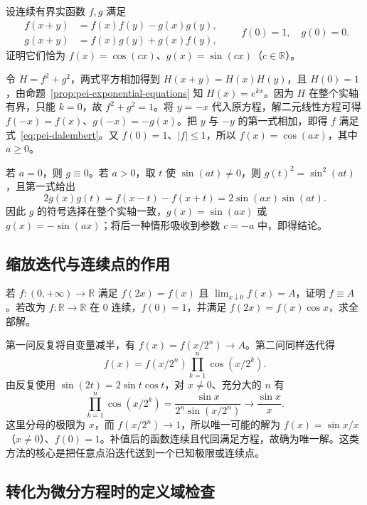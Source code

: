 \begin{example}
设连续有界实函数 $f,g$ 满足
\[
\begin{aligned}
f(x+y)&=f(x)f(y)-g(x)g(y),\\
g(x+y)&=f(x)g(y)+g(x)f(y),
\end{aligned}
\qquad f(0)=1,\quad g(0)=0.
\]
证明它们恰为 $f(x)=\cos(cx)$、$g(x)=\sin(cx)$（$c\in\mathbb R$）。
\end{example}

\begin{solve}
令 $H=f^2+g^2$，两式平方相加得到 $H(x+y)=H(x)H(y)$，且 $H(0)=1$，由命题~\ref{prop:pei-exponential-equations} 知 $H(x)=e^{kx}$。因为 $H$ 在整个实轴有界，只能 $k=0$，故 $f^2+g^2=1$。将 $y=-x$ 代入原方程，解二元线性方程可得 $f(-x)=f(x)$、$g(-x)=-g(x)$。把 $y$ 与 $-y$ 的第一式相加，即得 $f$ 满足式~\eqref{eq:pei-dalembert}。又 $f(0)=1$、$|f|\le1$，所以 $f(x)=\cos(ax)$，其中 $a\ge0$。

若 $a=0$，则 $g\equiv0$。若 $a>0$，取 $t$ 使 $\sin(at)\ne0$，则 $g(t)^2=\sin^2(at)$，且第一式给出
\[
2g(x)g(t)=f(x-t)-f(x+t)=2\sin(ax)\sin(at).
\]
因此 $g$ 的符号选择在整个实轴一致，$g(x)=\sin(ax)$ 或 $g(x)=-\sin(ax)$；将后一种情形吸收到参数 $c=-a$ 中，即得结论。
\end{solve}

\subsection{缩放迭代与连续点的作用}

\begin{example}
若 $f:(0,+\infty)\to\mathbb R$ 满足 $f(2x)=f(x)$ 且 $\lim_{x\downarrow0}f(x)=A$，证明 $f\equiv A$。若改为 $f:\mathbb R\to\mathbb R$ 在 $0$ 连续，$f(0)=1$，并满足 $f(2x)=f(x)\cos x$，求全部解。
\end{example}

\begin{solve}
第一问反复将自变量减半，有 $f(x)=f(x/2^n)\to A$。第二问同样迭代得
\[
f(x)=f(x/2^n)\prod_{k=1}^n\cos(x/2^k).
\]
由反复使用 $\sin(2t)=2\sin t\cos t$，对 $x\ne0$、充分大的 $n$ 有
\[
\prod_{k=1}^n\cos(x/2^k)=\frac{\sin x}{2^n\sin(x/2^n)}\longrightarrow\frac{\sin x}{x}.
\]
这里分母的极限为 $x$，而 $f(x/2^n)\to1$，所以唯一可能的解为 $f(x)=\sin x/x$（$x\ne0$）、$f(0)=1$。补值后的函数连续且代回满足方程，故确为唯一解。这类方法的核心是把任意点沿迭代送到一个已知极限或连续点。
\end{solve}

\subsection{转化为微分方程时的定义域检查}

